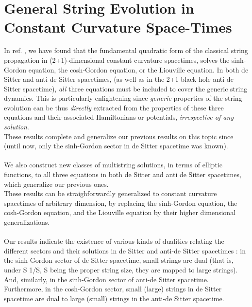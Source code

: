 \documentclass[12pt,a4paper]{article}
\begin{document}
\section{General String Evolution in Constant Curvature Space-Times}
In ref. \cite{ls5}, we have found that the fundamental quadratic form of the 
classical string propagation in (2+1)-dimensional constant curvature 
spacetimes, solves the sinh-Gordon equation, the cosh-Gordon equation, or the 
Liouville equation. In both de Sitter and anti-de Sitter spacetimes, (as well 
as in the 2+1 black hole anti-de Sitter spacetime), {\it all} three equations 
must be included to cover the generic string dynamics. This is particularly 
enlightening since {\it generic} properties of the string evolution can be thus {\it directly} extracted from the properties of these three equations and 
their associated Hamiltonians or potentials, {\it irrespective of any solution}. \\These results complete and generalize our previous results on 
this topic since 
(until now, only the sinh-Gordon sector in de Sitter spacetime was known). \\ 
\\
We also construct new classes of multistring solutions, in terms of elliptic 
functions, to all three equations in both de Sitter and anti de Sitter 
spacetimes, which generalize our previous ones. \\These results can be 
straighforwardly generalized to constant curvature spacetimes of arbitrary 
dimension, by replacing the sinh-Gordon equation, the cosh-Gordon equation, and the Liouville equation by their higher dimensional generalizations. \\ \\
Our results indicate the existence of various kinds of dualities relating the 
different sectors and their solutions in de Sitter and anti-de Sitter 
spacetimes : in the sinh-Gordon sector of de Sitter spacetime, small strings 
are dual (that is, under S \myHighlight{$\rightarrow$}\coordHE{} 1/S, S being the proper string size, they are mapped to large strings). And, similarly, in the sinh-Gordon sector of 
anti-de Sitter spacetime. Furthermore, in the cosh-Gordon sector, small (large) strings in de Sitter spacetime are dual to large (small) strings in the 
anti-de Sitter spacetime.
\end{document}

